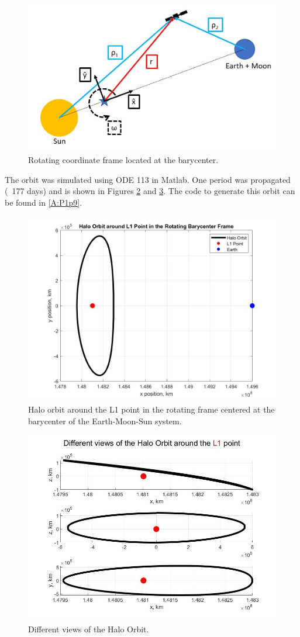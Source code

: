 \documentclass[12pt,a4paper,notitlepage]{article}
\begin{document}
\begin{figure}[H]
  \centering
    \includegraphics[width=.75\textwidth]{Images/barycenterframe.JPG}
  \caption{Rotating coordinate frame located at the barycenter.}
  \label{fig:frame}
\end{figure}


The orbit was simulated using ODE 113 in Matlab. One period was propagated (~177 days) and is shown in Figures \ref{fig:halo} and \ref{fig:haloL1}. The code to generate this orbit can be found in \ref{A:P1p9}.

\begin{figure}[H]
  \centering
    \includegraphics[width=.75\textwidth]{Images/halorotating.jpg}
  \caption{Halo orbit around the L1 point in the rotating frame centered at the barycenter of the Earth-Moon-Sun system.}
  \label{fig:halo}
\end{figure}

\begin{figure}[H]
  \centering
    \includegraphics[width=.75\textwidth]{Images/haloL1.jpg}
  \caption{Different views of the Halo Orbit.}
  \label{fig:haloL1}
\end{figure}
\end{document}

